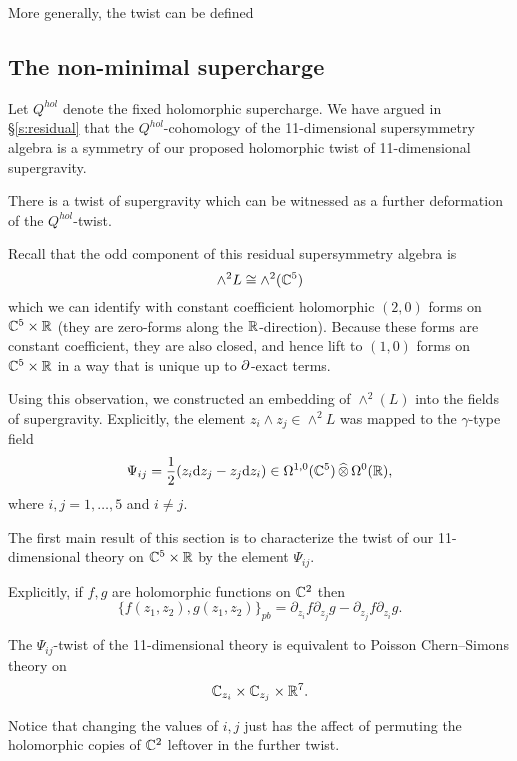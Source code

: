 \documentclass[11pt]{amsart}
\begin{document}
More generally, the twist can be defined 



\subsection{The non-minimal supercharge}

Let $Q^{hol}$ denote the fixed holomorphic supercharge. 
We have argued in \S \ref{s:residual} that the $Q^{hol}$-cohomology of the 11-dimensional supersymmetry algebra is a symmetry of our proposed holomorphic twist of 11-dimensional supergravity. 

There is a twist of supergravity which can be witnessed as a further deformation of the $Q^{hol}$-twist. 

Recall that the odd component of this residual supersymmetry algebra is
\[
\wedge^2 L \cong \wedge^2(\mathbb C^5) 
\]
which we can identify with constant coefficient holomorphic $(2,0)$ forms on $\mathbb C^5 \times \mathbb R$ (they are zero-forms along the $\mathbb R$-direction). 
Because these forms are constant coefficient, they are also closed, and hence lift to $(1,0)$ forms on $\mathbb C^5 \times \mathbb R$ in a way that is unique up to $\partial$-exact terms. 

Using this observation, we constructed an embedding of $\wedge^2(L)$ into the fields of supergravity. 
Explicitly, the element $z_i \wedge z_j \in \wedge^2 L$ was mapped to the $\gamma$-type field
\[
\Psi_{ij} = \frac12 (z_i {\rm d} z_j - z_j {\rm d} z_i) \in \Omega^{1,0}(\mathbb C^5) \, \widehat{\otimes} \, \Omega^0(\mathbb R) ,
\]
where $i,j=1,\ldots, 5$ and $i \ne j$.  

\parsec[-] 

The first main result of this section is to characterize the twist of our 11-dimensional theory on $\mathbb C^5 \times \mathbb R$ by the element $\Psi_{ij}$. 

Explicitly, if $f,g$ are holomorphic functions on $\mathbb C^2$ then
\[
\{f(z_1,z_2) , g(z_1,z_2)\}_{pb} = \partial_{z_i} f \partial_{z_j} g - \partial_{z_j} f \partial_{z_i} g .
\]

\begin{thm}
The $\Psi_{ij}$-twist of the 11-dimensional theory is equivalent to Poisson Chern--Simons theory on 
\[
\mathbb C_{z_i} \times \mathbb C_{z_j} \times \mathbb R^7 .
\]
\end{thm}

Notice that changing the values of $i,j$ just has the affect of permuting the holomorphic copies of $\mathbb C^2$ leftover in the further twist. 
\end{document}
